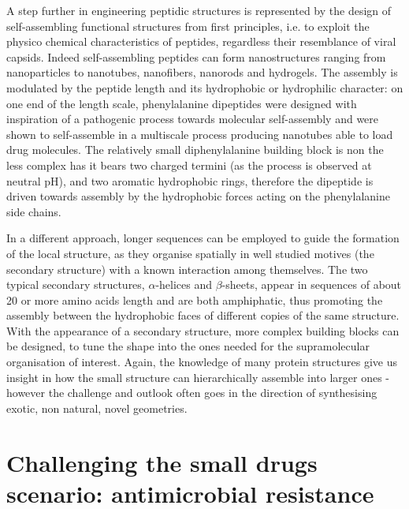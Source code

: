 \documentclass[a4paper,11pt]{extreport}
\begin{document}
A step further in engineering peptidic structures is represented by the design of self-assembling functional structures from first principles, i.e. to exploit the physico chemical characteristics of peptides, regardless their resemblance of viral capsids.
%
Indeed self-assembling peptides can form nanostructures ranging from nanoparticles to nanotubes, nanofibers, nanorods and hydrogels.\cite{Fan2017,Habibi2016} The assembly is modulated by the peptide length and its hydrophobic or hydrophilic character: on one end of the length scale, phenylalanine dipeptides were designed with inspiration of a pathogenic process towards molecular self-assembly\cite{Yan2010} and were shown to self-assemble in a multiscale process producing nanotubes able to load drug molecules.\cite{Silva2013} The relatively small diphenylalanine building block is non the less complex has it bears two charged termini (as the process is observed at neutral pH), and two aromatic hydrophobic rings, therefore the dipeptide is driven towards assembly by the hydrophobic forces acting on the phenylalanine side chains.

In a different approach, longer sequences can be employed to guide the formation of the local structure, as they organise spatially in well studied motives (the secondary structure) with a known interaction among themselves.
%
The two typical secondary structures, $\alpha$-helices and $\beta$-sheets, appear in sequences of about 20 or more amino acids length and are both amphiphatic, thus promoting the assembly between the hydrophobic faces of different copies of the same structure. With the appearance of a secondary structure, more complex building blocks can be designed, to tune the shape into the ones needed for the supramolecular organisation of interest.\cite{King2014} Again, the knowledge of many protein structures\cite{PDB} give us insight in how the small structure can hierarchically assemble into larger ones - however the challenge and outlook often goes in the direction of synthesising exotic, non natural, novel geometries.\cite{Yeates2019,Malay2019}


\section{Challenging the small drugs scenario: antimicrobial resistance}

\end{document}
